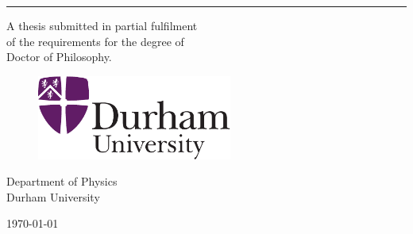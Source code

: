   \chapter*{}
  \thispagestyle{empty} 
  \vspace{-1cm}
  \begin{center}
  {\huge\textbf{\thesistitle}\par}

  \vspace{1.5cm} {\Large{\textbf{\myname}}}
  \par
  \rule{8cm}{0.2mm} \vspace{0.7cm} \par {A thesis submitted in
  partial fulfilment \\of the requirements for the degree of
  \\Doctor of Philosophy.}
  \vspace{3.0truecm} %
  \par
  \begin{figure}[h]
  \centering \includegraphics[width=6.4cm]{figs/crest.pdf}
  \end{figure}

  {\large Department of Physics} \vspace{0.15cm}\\{\large Durham
  University} \vspace{0.5cm}
  \\
  \begin{large}
  \today
  \end{large}
  \end{center}

  \newpage